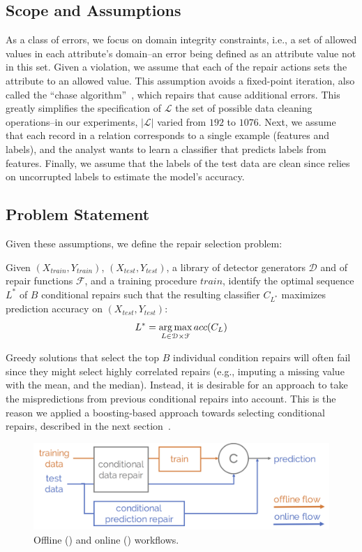 \subsection{Scope and Assumptions}
As a class of errors, we focus on domain integrity constraints, i.e., a set of allowed values in each attribute's domain--an error being defined as an attribute value not in this set.
Given a violation, we assume that each of the repair actions sets the attribute to an allowed value.
This assumption avoids a fixed-point iteration, also called the ``chase algorithm''~\cite{aho1979theory}, which repairs that cause additional errors.
This greatly simplifies the specification of $\mathcal{L}$ the set of possible data cleaning operations--in our experiments, $|\mathcal{L}|$ varied from $192$ to $1076$.
Next, we assume that each record in a relation corresponds to a single example (features and labels), and the analyst wants to learn a classifier that predicts labels from features.
Finally, we assume that the labels of the test data are clean since \sys relies on uncorrupted labels to estimate the model's accuracy.

\subsection{Problem Statement}
Given these assumptions, we define the repair selection problem:

\begin{problem}\sloppy
Given $(X_{train}, Y_{train})$, $(X_{test}, Y_{test})$, a library of detector generators $\mathcal{D}$ and of repair functions $\mathcal{F}$, and a training procedure $train$, identify the optimal sequence $L^*$ of $B$ conditional repairs such that the resulting classifier $C_{L^*}$  maximizes prediction accuracy on $(X_{test}, Y_{test})$:
$$L^* = \operatorname*{arg\,max}_{L \in \mathcal{D}\times\mathcal{F}} acc(C_L)$$
\end{problem}

Greedy solutions that select the top $B$ individual condition repairs will often fail since they might select highly correlated repairs (e.g., imputing a missing value with the mean, and the median).
Instead, it is desirable for an approach to take the mispredictions from previous conditional repairs into account.  This is the reason we applied a boosting-based approach towards selecting conditional repairs, described in the next section~\cite{schapire2003boosting}.

\begin{figure}\centering
\includegraphics[width=\columnwidth]{figures/workflow.png}
\caption{Offline () and online () workflows.}
\label{fig:workflow}
\end{figure}


